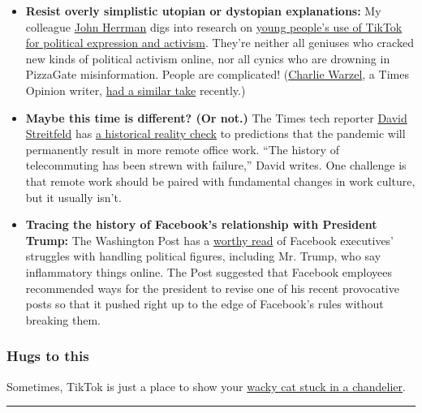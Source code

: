 \begin{itemize}
\item
  \textbf{Resist overly simplistic utopian or dystopian explanations:}
  My colleague \href{https://www.nytimes.com/by/john-herrman}{John
  Herrman} digs into research on
  \href{https://www.nytimes.com/2020/06/28/style/tiktok-teen-politics-gen-z.html}{young
  people's use of TikTok for political expression and activism}. They're
  neither all geniuses who cracked new kinds of political activism
  online, nor all cynics who are drowning in PizzaGate misinformation.
  People are complicated!
  (\href{https://www.nytimes.com/by/charlie-warzel}{Charlie Warzel}, a
  Times Opinion writer,
  \href{https://www.nytimes.com/2020/06/22/opinion/trump-protest-gen-z.html}{had
  a similar take} recently.)
\item
  \textbf{Maybe this time is different? (Or not.)} The Times tech
  reporter \href{https://www.nytimes.com/by/david-streitfeld}{David
  Streitfeld} has
  \href{https://www.nytimes.com/2020/06/29/technology/working-from-home-failure.html}{a
  historical reality check} to predictions that the pandemic will
  permanently result in more remote office work. ``The history of
  telecommuting has been strewn with failure,'' David writes. One
  challenge is that remote work should be paired with fundamental
  changes in work culture, but it usually isn't.
\item
  \textbf{Tracing the history of Facebook's relationship with President
  Trump:} The Washington Post has a
  \href{https://www.washingtonpost.com/people/elizabeth-dwoskin/}{worthy
  read} of Facebook executives' struggles with handling political
  figures, including Mr. Trump, who say inflammatory things online. The
  Post suggested that Facebook employees recommended ways for the
  president to revise one of his recent provocative posts so that it
  pushed right up to the edge of Facebook's rules without breaking them.
\end{itemize}

\hypertarget{hugs-to-this}{%
\subsubsection{Hugs to this}\label{hugs-to-this}}

Sometimes, TikTok is just a place to show your
\href{https://www.tiktok.com/@mzav7/video/6842879004727430406}{wacky cat
stuck in a chandelier}.

\begin{center}\rule{0.5\linewidth}{\linethickness}\end{center}

